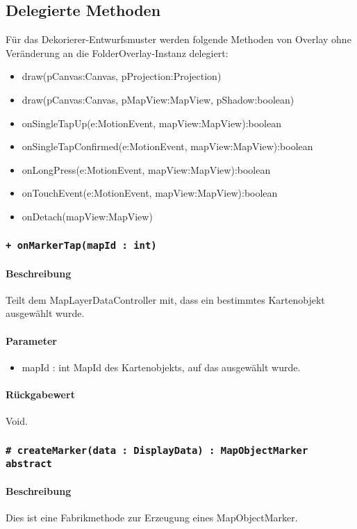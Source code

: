 \subsection{Delegierte Methoden}
Für das Dekorierer-Entwurfsmuster werden folgende Methoden von Overlay ohne Veränderung 
an die FolderOverlay-Instanz delegiert:
\begin{itemize}
    \item draw(pCanvas:Canvas, pProjection:Projection)
    \item draw(pCanvas:Canvas, pMapView:MapView, pShadow:boolean)
    \item onSingleTapUp(e:MotionEvent, mapView:MapView):boolean
    \item onSingleTapConfirmed(e:MotionEvent, mapView:MapView):boolean
    \item onLongPress(e:MotionEvent, mapView:MapView):boolean
    \item onTouchEvent(e:MotionEvent, mapView:MapView):boolean
    \item onDetach(mapView:MapView)
\end{itemize}

\subsubsection{\texttt{+ onMarkerTap(mapId : int)}}%
\paragraph*{Beschreibung}
Teilt dem MapLayerDataController mit, dass ein bestimmtes Kartenobjekt ausgewählt wurde.
\paragraph*{Parameter}
\begin{itemize}
    \item mapId : int MapId des Kartenobjekts, auf das ausgewählt wurde.
\end{itemize}
\paragraph*{Rückgabewert}
Void.

\subsubsection{\texttt{# createMarker(data : DisplayData) : MapObjectMarker {abstract}}}%
\paragraph*{Beschreibung}
Dies ist eine Fabrikmethode zur Erzeugung eines MapObjectMarker.

